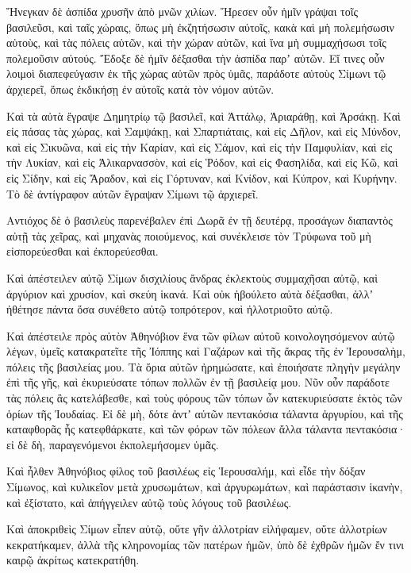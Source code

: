 {Ἤνεγκαν δὲ ἀσπίδα χρυσῆν ἀπὸ μνῶν χιλίων.
Ἤρεσεν οὖν ἡμῖν γράψαι τοῖς βασιλεῦσι, καὶ ταῖς χώραις, ὅπως μὴ ἐκζητήσωσιν αὐτοῖς, κακὰ καὶ μὴ πολεμήσωσιν αὐτοὺς, καὶ τὰς πόλεις αὐτῶν, καὶ τὴν χώραν αὐτῶν, καὶ ἵνα μὴ συμμαχήσωσι τοῖς πολεμοῦσιν αὐτούς.
Ἔδοξε δὲ ἡμῖν δέξασθαι τὴν ἀσπίδα παρʼ αὐτῶν.
Εἴ τινες οὖν λοιμοὶ διαπεφεύγασιν ἐκ τῆς χώρας αὐτῶν πρὸς ὑμᾶς, παράδοτε αὐτοὺς Σίμωνι τῷ ἀρχιερεῖ, ὅπως ἐκδικήσῃ ἐν αὐτοῖς κατὰ τὸν νόμον αὐτῶν.
\par }{\PP {}Καὶ τὰ αὐτὰ ἔγραψε Δημητρίῳ τῷ βασιλεῖ, καὶ Ἀττάλῳ, Ἀριαράθῃ, καὶ Ἀρσάκῃ.
Καὶ εἰς πάσας τὰς χώρας, καὶ Σαμψάκῃ, καὶ Σπαρτιάταις, καὶ εἰς Δῆλον, καὶ εἰς Μύνδον, καὶ εἰς Σικυῶνα, καὶ εἰς τὴν Καρίαν, καὶ εἰς Σάμον, καὶ εἰς τὴν Παμφυλίαν, καὶ εἰς τὴν Λυκίαν, καὶ εἰς Ἀλικαρνασσὸν, καὶ εἰς Ῥόδον, καὶ εἰς Φασηλίδα, καὶ εἰς Κῶ, καὶ εἰς Σίδην, καὶ εἰς Ἄραδον, καὶ εἰς Γόρτυναν, καὶ Κνίδον, καὶ Κύπρον, καὶ Κυρήνην.
Τὸ δὲ ἀντίγραφον αὐτῶν ἔγραψαν Σίμωνι τῷ ἀρχιερεῖ.
\par }{\PP {}Αντιόχος δὲ ὁ βασιλεὺς παρενέβαλεν ἐπὶ Δωρᾶ ἐν τῇ δευτέρᾳ, προσάγων διαπαντὸς αὐτῇ τὰς χεῖρας, καὶ μηχανὰς ποιούμενος, καὶ συνέκλεισε τὸν Τρύφωνα τοῦ μὴ εἰσπορεύεσθαι καὶ ἐκπορεύεσθαι.
\par }{\PP {}Καὶ ἀπέστειλεν αὐτῷ Σίμων δισχιλίους ἄνδρας ἐκλεκτοὺς συμμαχῆσαι αὐτῷ, καὶ ἀργύριον καὶ χρυσίον, καὶ σκεύη ἱκανά.
Καὶ οὐκ ἠβούλετο αὐτὰ δέξασθαι, ἀλλʼ ἠθέτησε πάντα ὅσα συνέθετο αὐτῷ τοπρότερον, καὶ ἠλλοτριοῦτο αὐτῷ.
\par }{\PP {}Καὶ ἀπέστειλε πρὸς αὐτὸν Ἀθηνόβιον ἕνα τῶν φίλων αὐτοῦ κοινολογησόμενον αὐτῷ λέγων, ὑμεῖς κατακρατεῖτε τῆς Ἰόππης καὶ Γαζάρων καὶ τῆς ἄκρας τῆς ἐν Ἱερουσαλὴμ, πόλεις τῆς βασιλείας μου.
Τὰ ὅρια αὐτῶν ἠρημώσατε, καὶ ἐποιήσατε πληγὴν μεγάλην ἐπὶ τῆς γῆς, καὶ ἐκυριεύσατε τόπων πολλῶν ἐν τῇ βασιλείᾳ μου.
Νῦν οὖν παράδοτε τὰς πόλεις ἃς κατελάβεσθε, καὶ τοὺς φόρους τῶν τόπων ὧν κατεκυριεύσατε ἐκτὸς τῶν ὁρίων τῆς Ἰουδαίας.
Εἰ δὲ μὴ, δότε ἀντʼ αὐτῶν πεντακόσια τάλαντα ἀργυρίου, καὶ τῆς καταφθορᾶς ἧς κατεφθάρκατε, καὶ τῶν φόρων τῶν πόλεων ἄλλα τάλαντα πεντακόσια· εἰ δὲ δὴ, παραγενόμενοι ἐκπολεμήσομεν ὑμᾶς.
\par }{\PP {}Καὶ ἦλθεν Ἀθηνόβιος φίλος τοῦ βασιλέως εἰς Ἱερουσαλήμ, καὶ εἶδε τὴν δόξαν Σίμωνος, καὶ κυλικεῖον μετὰ χρυσωμάτων, καὶ ἀργυρωμάτων, καὶ παράστασιν ἱκανὴν, καὶ ἐξίστατο, καὶ ἀπήγγειλεν αὐτῷ τοὺς λόγους τοῦ βασιλέως.
\par }{\PP {}Καὶ ἀποκριθεὶς Σίμων εἶπεν αὐτῷ, οὔτε γῆν ἀλλοτρίαν εἰλήφαμεν, οὔτε ἀλλοτρίων κεκρατήκαμεν, ἀλλὰ τῆς κληρονομίας τῶν πατέρων ἡμῶν, ὑπὸ δὲ ἐχθρῶν ἡμῶν ἔν τινι καιρῷ ἀκρίτως κατεκρατήθη.
}
